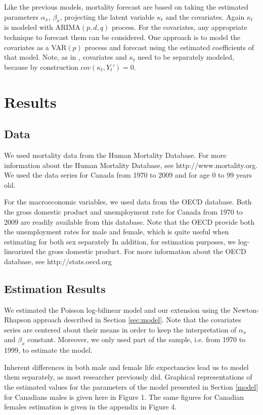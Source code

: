 \documentclass[AER, draftmode]{AEA}
\begin{document}
Like the previous models, mortality forecast are based on taking the estimated parameters $\alpha_x$, $\beta_x$, projecting the latent variable $\kappa_t$ and the covariates. Again $\kappa_t$ is modeled with ARIMA$(p,d,q)$ process. For the covariates, any appropriate technique to forecast them can be considered. One approach is to model the covariates as a VAR$(p)$ process and forecast using the estimated coefficients of that model. Note, as in \cite{Niu2014}, covariates and $\kappa_t$ need to be separately modeled, because by construction $cov(\kappa_t, Y_t') = 0$.


\section{Results} \label{sec:results} 

\subsection{Data}

We used mortality data from the Human Mortality Database. For more information about the Human Mortality Database, see http://www.mortality.org. We used the data series for Canada from 1970 to 2009 and for age 0 to 99 years old. 

For the macroeconomic variables, we used data from the OECD database. Both the gross domestic product and unemployment rate for Canada from 1970 to 2009 are readily available from this database. Note that the OECD provide both the unemployment rates for male and female, which is quite useful when estimating for both sex separately In addition, for estimation purposes, we log-linearized the gross domestic product. For more information about the OECD database, see http://stats.oecd.org


\subsection{Estimation Results}

We estimated the \cite{Brouhns2002} Poisson log-bilinear model and our extension using the Newton-Rhapson approach described in Section \ref{sec:model}. Note that the covariates series are centered about their means in order to keep the interpretation of $\alpha_x$ and $\beta_x$ constant. Moreover, we only used part of the sample, i.e. from 1970 to 1999, to estimate the model.

Inherent differences in both male and female life expectancies lead us to model them separately, as most researcher previously did. Graphical representations of the estimated values for the parameters of the model presented in Section \ref{model} for Canadians males is given here in Figure 1. The same figures for Canadian females estimation is given in the appendix in Figure 4.
\end{document}
